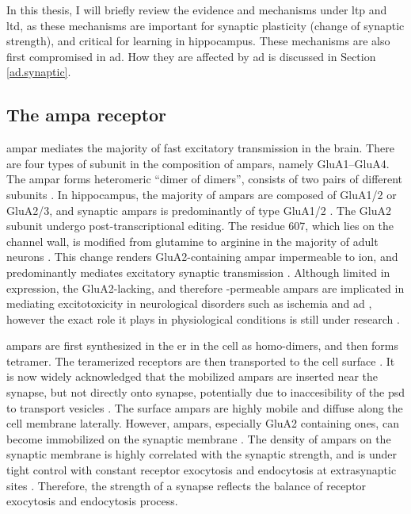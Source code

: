 In this thesis, I will briefly review the evidence and mechanisms under \gls{ltp} and \gls{ltd}, as these mechanisms are important for synaptic plasticity (change of synaptic strength), and critical for learning in hippocampus. These mechanisms are also first compromised in \gls{ad}. How they are affected by \gls{ad} is discussed in Section \ref{ad.synaptic}. 

\subsection{The \gls{ampa} receptor}

\gls{ampar} mediates the majority of fast excitatory transmission in the brain. There are four types of subunit in the composition of \glspl{ampar}, namely GluA1--GluA4. The \gls{ampar} forms heteromeric ``dimer of dimers'', consists of two pairs of different subunits \citep{ayalon01}. In hippocampus, the majority of \glspl{ampar} are composed of GluA1/2 or GluA2/3, and synaptic \glspl{ampar} is predominantly of type GluA1/2 \citep{wenthold96, lu09}. The GluA2 subunit undergo post-transcriptional editing. The residue 607, which lies on the channel wall, is modified from glutamine to arginine in the majority of adult neurons \citep{greger03}. This change renders GluA2-containing \gls{ampar} impermeable to  ion, and predominantly mediates excitatory synaptic transmission \citep{sommer91,swanson97}. Although limited in expression, the GluA2-lacking, and therefore -permeable \glspl{ampar} are implicated in mediating excitotoxicity in neurological disorders such as ischemia and \gls{ad} \citep{kwak06, whitehead17}, however the exact role it plays in physiological conditions is still under research \citep{whitehead17}.

\Glspl{ampar} are first synthesized in the \gls{er} in the cell as homo-dimers, and then forms tetramer. The teramerized receptors are then transported to the cell surface \citep{henley13}. It is now widely acknowledged that the mobilized \glspl{ampar} are inserted near the synapse, but not directly onto synapse, potentially due to inaccesibility of the \gls{psd} to transport vesicles \citep{henley11, chater14}. The surface \glspl{ampar} are highly mobile and diffuse along the cell membrane laterally. However, \glspl{ampar}, especially GluA2 containing ones, can become immobilized on the synaptic membrane \citep{borgdorff02, groc04}. The density of \glspl{ampar} on the synaptic membrane is highly correlated with the synaptic strength, and is under tight control with constant receptor exocytosis and endocytosis at extrasynaptic sites \citep{malinow02, henley11}. Therefore, the strength of a synapse reflects the balance of receptor exocytosis and endocytosis process. 

